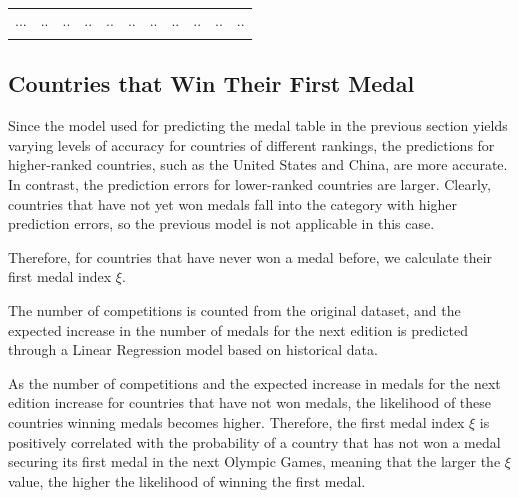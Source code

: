 \documentclass[12pt]{article}  %
\begin{document}
\begin{longtable}{l|c|c|c|c|c|c|c|c|c|c}
	\hline
	...                  & ..                                                                     & ..                                                                     & ..                                                                     & ..                                                                     & ..                                                                     & ..                                                                     & ..                        & ..                          & ..                          & ..                         \\
	\multicolumn{1}{l}{} & \multicolumn{1}{c}{}                                                   & \multicolumn{1}{c}{}                                                   & \multicolumn{1}{c}{}                                                   & \multicolumn{1}{c}{}                                                   & \multicolumn{1}{c}{}                                                   & \multicolumn{1}{c}{}                                                   & \multicolumn{1}{c}{}      & \multicolumn{1}{c}{}        & \multicolumn{1}{c}{}        &                           
\end{longtable}
\subsection{Countries that Win Their First Medal}
Since the model used for predicting the medal table in the previous section yields varying levels of accuracy for countries of different rankings, the predictions for higher-ranked countries, such as the United States and China, are more accurate. In contrast, the prediction errors for lower-ranked countries are larger. Clearly, countries that have not yet won medals fall into the category with higher prediction errors, so the previous model is not applicable in this case.

Therefore, for countries that have never won a medal before, we calculate their first medal index $\xi$.







The number of competitions is counted from the original dataset, and the expected increase in the number of medals for the next edition is predicted through a Linear Regression model based on historical data.

As the number of competitions and the expected increase in medals for the next edition increase for countries that have not won medals, the likelihood of these countries winning medals becomes higher. Therefore, the first medal index $\xi$ is positively correlated with the probability of a country that has not won a medal securing its first medal in the next Olympic Games, meaning that the larger the $\xi$ value, the higher the likelihood of winning the first medal.
\end{document}
